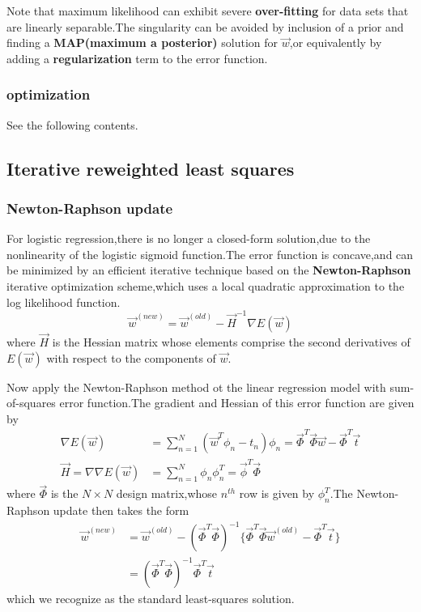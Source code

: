 Note that maximum likelihood can exhibit severe \textbf{over-fitting} for data sets that are linearly separable.The singularity can be avoided by inclusion of a prior and finding a \textbf{MAP(maximum a posterior)} solution for $\vec{w}$,or equivalently by adding a \textbf{regularization} term to the error function.



\subsubsection{optimization}
See the following contents.
\subsection{Iterative reweighted least squares}
\subsubsection{Newton-Raphson update}
For logistic regression,there is no longer a closed-form solution,due to the nonlinearity of the logistic sigmoid function.The error function is concave,and can be minimized by an efficient iterative technique based on the \textbf{Newton-Raphson} iterative optimization scheme,which  uses a local quadratic approximation to the log likelihood function.
\begin{equation}
\vec{w}^{(new)} = \vec{w}^(old)-\vec{H}^{-1}\nabla E(\vec{w})
\end{equation}
where $\vec{H}$ is the Hessian matrix whose elements comprise the second derivatives of $E(\vec{w})$ with respect to the components of $\vec{w}$.

Now apply the Newton-Raphson method ot the linear regression model with sum-of-squares error function.The gradient and Hessian of this error function are given by
\begin{align}
\nabla E(\vec{w}) &= \sum_{n=1}^{N}(\vec{w}^T\phi_n-t_n)\phi_n = \vec{\Phi}^T\vec{\Phi}\vec{w} - \vec{\Phi}^T\vec{t} \\
\vec{H} = \nabla\nabla E(\vec{w}) &= \sum_{n=1}^{N}\phi_n\phi_n^T=\vec{\phi}^T\vec{\Phi}
\end{align}
where $\vec{\Phi}$ is the $N\times N$ design matrix,whose $n^{th}$ row is given by $\phi_n^T$.The Newton-Raphson update then takes the form
\begin{align}
\vec{w}^{(new)} &= \vec{w}^{(old)} -(\vec{\Phi}^T\vec{\Phi})^{-1}\{\vec{\Phi}^T\vec{\Phi}\vec{w}^{(old)} -\vec{\Phi}^T\vec{t} \} \\
&=(\vec{\Phi}^T\vec{\Phi})^{-1}\vec{\Phi}^T\vec{t}
\end{align}
which we recognize as the standard least-squares solution.

